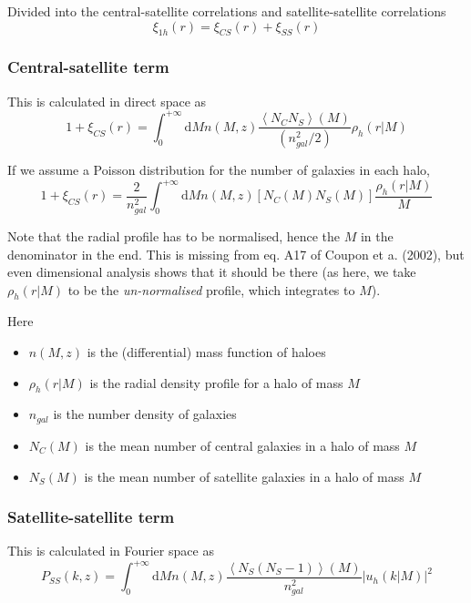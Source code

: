 \documentclass[10pt,a4paper]{article}
\begin{document}
Divided into the central-satellite correlations and satellite-satellite correlations
\begin{equation}
\xi_{1h}(r) = \xi_{CS}(r) + \xi_{SS}(r)
\end{equation}

\subsubsection{Central-satellite term}

This is calculated in direct space as
\begin{equation}
1 + \xi_{CS}(r) = \int_0^{+\infty} \mathrm{d}M n(M,z) \frac{\left\langle N_C N_S\right\rangle(M)}{(n_{gal}^2/2)}\rho_h(r|M)
\end{equation}

If we assume a Poisson distribution for the number of galaxies in each halo,
\begin{equation}
1 + \xi_{CS}(r) = \frac{2}{n_{gal}^2} \int_0^{+\infty} \mathrm{d}M n(M,z) \left[N_C(M) N_S(M)\right] \frac{\rho_h(r|M)}{M}
\end{equation}

Note that the radial profile has to be normalised, hence the $M$ in the denominator in the end. 
This is missing from eq. A17 of Coupon et a. (2002), but even dimensional analysis shows that it should be there (as here, we take $\rho_h(r|M)$ to be the \emph{un-normalised} profile, which integrates to $M$).



Here
\begin{itemize}
\item $n(M,z)$ is the (differential) mass function of haloes
\item $\rho_h(r|M)$ is the radial density profile for a halo of mass $M$
\item $n_{gal}$ is the number density of galaxies
\item $N_C(M)$ is the mean number of central galaxies in a halo of mass $M$
\item $N_S(M)$ is the mean number of satellite galaxies in a halo of mass $M$
\end{itemize}

\subsubsection{Satellite-satellite term}

This is calculated in Fourier space as
\begin{equation}
P_{SS}(k,z) = \int_0^{+\infty} \mathrm{d}M n(M,z) \frac{\left\langle N_S (N_S - 1) \right\rangle(M)}{n_{gal}^2} \left| u_h(k|M)\right|^2
\end{equation}
\end{document}
